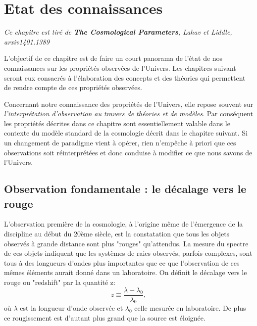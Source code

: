 \chapter{Etat des connaissances}

\textit{Ce chapitre est tiré de \textbf{The Cosmological Parameters}, Lahav et Liddle, arxiv1401.1389}

L'objectif de ce chapitre est de faire un court panorama de l'état de nos connaissances sur les propriétés observées de l'Univers. Les chapitres suivant seront eux consacrés à l'élaboration des concepts et des théories qui permettent de rendre compte de ces propriétés observées. 

Concernant notre connaissance des propriétés de l'Univers, elle repose souvent sur \textit{l'interprétation d'observation au travers de théories et de modèles}. Par conséquent les propriétés décrites dans ce chapitre sont essentiellement valable dans le contexte du modèle standard de la cosmologie décrit dans le chapitre suivant. Si un changement de paradigme vient à opérer, rien n'empêche à priori que ces observations soit réinterprétées et donc conduise à modifier ce que nous savons de l'Univers.

\section{Observation fondamentale : le décalage vers le rouge}
L'observation première de la cosmologie, à l'origine même de l'émergence de la discipline au début du 20ème siècle, est la constatation que tous les objets observés à grande distance sont plus "rouges" qu'attendus. La mesure du spectre de ces objets indiquent que les systèmes de raies observés, parfois complexes, sont tous à des longueurs d'ondes plus importantes que ce que l'observation de ces mêmes éléments aurait donné dans un laboratoire. On définit le décalage vers le rouge ou "redshift" par la quantité z:
\begin{equation}
z\equiv\frac{\lambda-\lambda_0}{\lambda_0},
\end{equation}
où $\lambda$ est la longueur d'onde observée et $\lambda_0$ celle mesurée en laboratoire. De plus ce rougissement est d'autant plus grand que la source est éloignée. 

